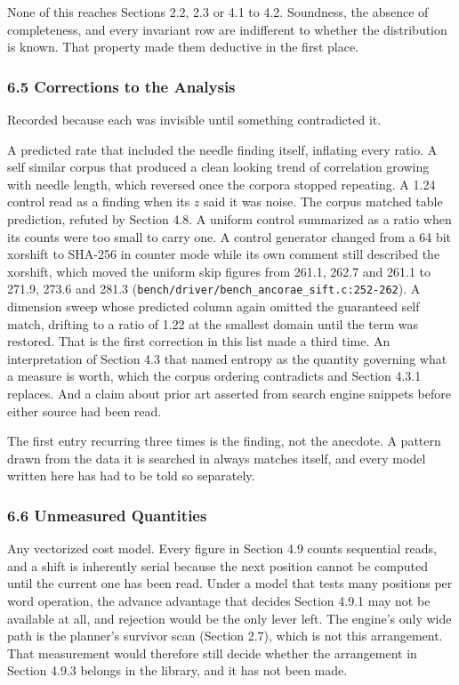 None of this reaches Sections 2.2, 2.3 or 4.1 to 4.2. Soundness, the absence of completeness, and every invariant row are indifferent to whether the distribution is known. That property made them deductive in the first place.

\subsubsection{6.5 Corrections to the Analysis}

Recorded because each was invisible until something contradicted it.

A predicted rate that included the needle finding itself, inflating every ratio. A self similar corpus that produced a clean looking trend of correlation growing with needle length, which reversed once the corpora stopped repeating. A 1.24 control read as a finding when its \(z\) said it was noise. The corpus matched table prediction, refuted by Section 4.8. A uniform control summarized as a ratio when its counts were too small to carry one. A control generator changed from a 64 bit xorshift to SHA-256 in counter mode while its own comment still described the xorshift, which moved the uniform skip figures from 261.1, 262.7 and 261.1 to 271.9, 273.6 and 281.3 (\texttt{bench/\allowbreak{}driver/\allowbreak{}bench\_\allowbreak{}ancorae\_\allowbreak{}sift.\allowbreak{}c:252-\allowbreak{}262}). A dimension sweep whose predicted column again omitted the guaranteed self match, drifting to a ratio of 1.22 at the smallest domain until the term was restored. That is the first correction in this list made a third time. An interpretation of Section 4.3 that named entropy as the quantity governing what a measure is worth, which the corpus ordering contradicts and Section 4.3.1 replaces. And a claim about prior art asserted from search engine snippets before either source had been read.

The first entry recurring three times is the finding, not the anecdote. A pattern drawn from the data it is searched in always matches itself, and every model written here has had to be told so separately.

\subsubsection{6.6 Unmeasured Quantities}

Any vectorized cost model. Every figure in Section 4.9 counts sequential reads, and a shift is inherently serial because the next position cannot be computed until the current one has been read. Under a model that tests many positions per word operation, the advance advantage that decides Section 4.9.1 may not be available at all, and rejection would be the only lever left. The engine's only wide path is the planner's survivor scan (Section 2.7), which is not this arrangement. That measurement would therefore still decide whether the arrangement in Section 4.9.3 belongs in the library, and it has not been made.

